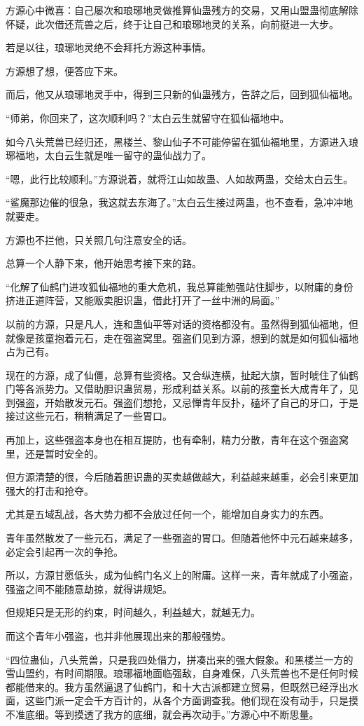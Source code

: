 \begin{this_body}
方源心中微喜：自己屡次和琅琊地灵做推算仙蛊残方的交易，又用山盟蛊彻底解除怀疑，此次借还荒兽之后，终于让自己和琅琊地灵的关系，向前挺进一大步。

若是以往，琅琊地灵绝不会拜托方源这种事情。

方源想了想，便答应下来。

而后，他又从琅琊地灵手中，得到三只新的仙蛊残方，告辞之后，回到狐仙福地。

“师弟，你回来了，这次顺利吗？”太白云生就留守在狐仙福地中。

如今八头荒兽已经归还，黑楼兰、黎山仙子不可能停留在狐仙福地里，方源进入琅琊福地，太白云生就是唯一留守的蛊仙战力了。

“嗯，此行比较顺利。”方源说着，就将江山如故蛊、人如故两蛊，交给太白云生。

“鲨魔那边催的很急，我这就去东海了。”太白云生接过两蛊，也不查看，急冲冲地就要走。

方源也不拦他，只关照几句注意安全的话。

总算一个人静下来，他开始思考接下来的路。

“化解了仙鹤门进攻狐仙福地的重大危机，我总算能勉强站住脚步，以附庸的身份挤进正道阵营，又能贩卖胆识蛊，借此打开了一丝中洲的局面。”

以前的方源，只是凡人，连和蛊仙平等对话的资格都没有。虽然得到狐仙福地，但就像是孩童抱着元石，走在强盗窝里。强盗们见到方源，想到的就是如何狐仙福地占为己有。

现在的方源，成了仙僵，总算有些资格。又合纵连横，扯起大旗，暂时唬住了仙鹤门等各派势力。又借助胆识蛊贸易，形成利益关系。以前的孩童长大成青年了，见到强盗，开始散发元石。强盗们想抢，又忌惮青年反扑，磕坏了自己的牙口，于是接过这些元石，稍稍满足了一些胃口。

再加上，这些强盗本身也在相互提防，也有牵制，精力分散，青年在这个强盗窝里，还是暂时安全的。

但方源清楚的很，今后随着胆识蛊的买卖越做越大，利益越来越重，必会引来更加强大的打击和抢夺。

尤其是五域乱战，各大势力都不会放过任何一个，能增加自身实力的东西。

青年虽然散发了一些元石，满足了一些强盗的胃口。但随着他怀中元石越来越多，必定会引起再一次的争抢。

所以，方源甘愿低头，成为仙鹤门名义上的附庸。这样一来，青年就成了小强盗，强盗之间不能随意劫掠，就得讲规矩。

但规矩只是无形的约束，时间越久，利益越大，就越无力。

而这个青年小强盗，也并非他展现出来的那般强势。

“四位蛊仙，八头荒兽，只是我四处借力，拼凑出来的强大假象。和黑楼兰一方的雪山盟约，有时间期限。琅琊福地面临强敌，自身难保，八头荒兽也不是任何时候都能借来的。我方虽然逼退了仙鹤门，和十大古派都建立贸易，但既然已经浮出水面，这些门派一定会千方百计的，从各个方面调查我。他们现在没有动手，只是摸不准底细。等到摸透了我方的底细，就会再次动手。”方源心中不断思量。


\end{this_body}
